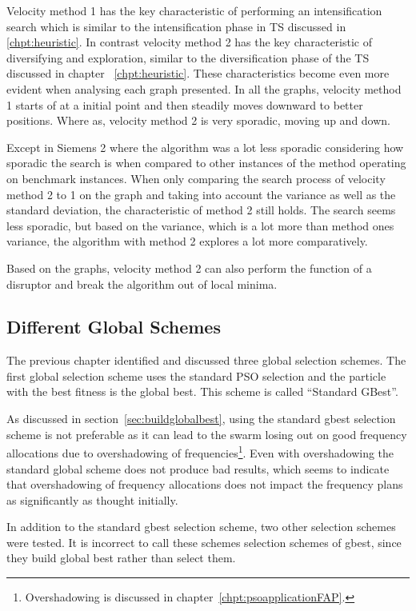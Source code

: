 Velocity method 1 has the key characteristic of performing an intensification search which is similar to the intensification phase in \gls{TS} discussed in \ref{chpt:heuristic}. In contrast velocity method 2 has the key characteristic of diversifying and exploration, similar to the diversification phase of the \gls{TS} discussed in chapter ~\ref{chpt:heuristic}. These characteristics become even more evident when analysing each graph presented. In all the graphs, velocity method 1 starts of at a initial point and then steadily moves downward to better positions. Where as, velocity method 2 is very sporadic, moving up and down. 

Except in Siemens 2 where the algorithm was a lot less sporadic considering how sporadic the search is when compared to other instances of the method operating on benchmark instances. When only comparing the search process of velocity method 2 to 1 on the graph and taking into account the variance as well as the standard deviation, the characteristic of method 2 still holds. The search seems less sporadic, but based on the variance, which is a lot more than method ones variance, the algorithm with method 2 explores a lot more comparatively.

Based on the graphs, velocity method 2 can also perform the function of a disruptor and break the algorithm out of local minima.

\subsection{Different Global Schemes}
\label{sec:diffglobalschemes}
The previous chapter identified and discussed three global selection schemes. The first global selection scheme uses the standard PSO selection and the particle with the best fitness is the global best. This scheme is called ``Standard GBest''.

As discussed in section~\ref{sec:buildglobalbest}, using the standard gbest selection scheme is not preferable as it can lead to the swarm losing out on good frequency allocations due to overshadowing of frequencies\footnote{Overshadowing is discussed in chapter~\ref{chpt:psoapplicationFAP}.}.
Even with overshadowing the standard global scheme does not produce bad results, which seems to indicate that overshadowing of frequency allocations does not impact the frequency plans as significantly as thought initially.

In addition to the standard gbest selection scheme, two other selection schemes were tested. It is incorrect to call these schemes selection schemes of gbest, since they build global best rather than select them.

